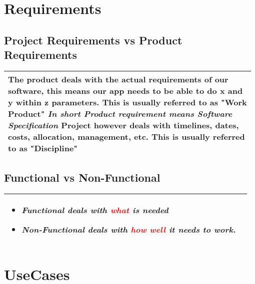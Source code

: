\documentclass[main.tex,fontsize=8pt,paper=a4,paper=portrait,DIV=calc,]{scrartcl}
\begin{document}
\begin{table}[h!]
\section{Requirements}
\subsection{Project Requirements vs Product Requirements}
\begin{tabular}{|m{0.977\linewidth}|}
\hline
The product deals with the actual requirements of our software, this means our app needs to be able to do x and y within z parameters.\newline
\textbf{This is usually referred to as "Work Product"}\newline
\textbf{\emph{In short Product requirement means Software Specification}}\newline
Project however deals with timelines, dates, costs, allocation, management, etc.\newline
\textbf{This is usually referred to as "Discipline"}\\
\hline
\end{tabular}
\subsection{Functional vs Non-Functional}
\begin{tabular}{|m{0.977\linewidth}|}
\hline
\vspace{2mm}
\begin{itemize}
  \item \textbf{\emph{Functional deals with \textcolor{red}{what} is needed}}
  \item \textbf{\emph{Non-Functional deals with \textcolor{red}{how well} it needs to work.}}
\vspace{-3mm}
\end{itemize}\\
\hline
\end{tabular}
\section{UseCases}

\end{table}
\end{document}
